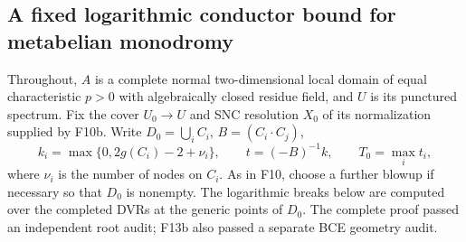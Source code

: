 \subsection{A fixed logarithmic conductor bound for metabelian monodromy}

Throughout, $A$ is a complete normal two-dimensional local domain
of equal characteristic $p>0$ with algebraically closed residue field,
and $U$ is its punctured spectrum. Fix the cover $U_0\to U$ and
SNC resolution $X_0$ of its normalization supplied by F10b. Write
$D_0=\bigcup_i C_i$, $B=(C_i\cdot C_j)$,
\[
 k_i=\max\{0,2g(C_i)-2+\nu_i\},\qquad
 t=(-B)^{-1}k,\qquad T_0=\max_i t_i,
 \tag{F13.1}
\]
where $\nu_i$ is the number of nodes on $C_i$. As in F10, choose
a further blowup if necessary so that $D_0$ is nonempty.
The logarithmic breaks below are computed over the completed DVRs
at the generic points of $D_0$. The complete proof passed an
independent root audit; F13b also passed a separate BCE geometry audit.

